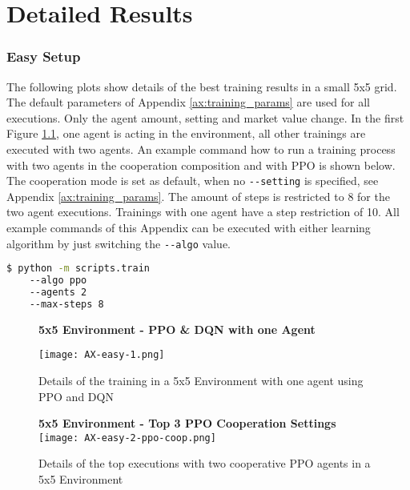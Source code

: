 \chapter{Detailed Results}\label{ax:plots}

\subsection{Easy Setup}
The following plots show details of the best training results in a small 5x5 grid. The default parameters of Appendix \ref{ax:training_params} are used for all executions. Only the agent amount, setting and market value change. In the first Figure \ref{fig:ax-easy-1}, one agent is acting in the environment, all other trainings are executed with two agents. An example command how to run a training process with two agents in the cooperation composition and with PPO is shown below. The cooperation mode is set as default, when no \verb|--setting| is specified, see Appendix \ref{ax:training_params}. The amount of steps is restricted to 8 for the two agent executions. Trainings with one agent have a step restriction of 10. All example commands of this Appendix can be executed with either learning algorithm by just switching the \verb|--algo| value. 

\begin{lstlisting}[float=htp,caption=Exemplary command to execute training with two PPO agents in a easy setup,label=lst:easy_command,language=bash ,xleftmargin=3ex,xrightmargin=1ex]
$ python -m scripts.train
    --algo ppo
    --agents 2
    --max-steps 8 
\end{lstlisting}

\newpage
\vfill
\begin{figure}
    \centering
    \textbf{5x5 Environment - PPO \& DQN with one Agent}\par\medskip
    \texttt{[image: AX-easy-1.png]}\\
    \caption[PPO and DQN Details of One Agent in a 5x5 Environment]{Details of the training in a 5x5 Environment with one agent using PPO and DQN}\label{fig:ax-easy-1}
\end{figure}
\vfill
\clearpage

\newpage
\vfill
\begin{figure}
    \centering
    \textbf{5x5 Environment - Top 3 PPO Cooperation Settings}
    \texttt{[image: AX-easy-2-ppo-coop.png]}\\
    \caption[Details of Top PPO Cooperation Executions in a 5x5 Environment]{Details of the top executions with two cooperative PPO agents in a 5x5 Environment}\label{fig:ax-easy-2-ppo-coop}
\end{figure}
\vfill
\clearpage

